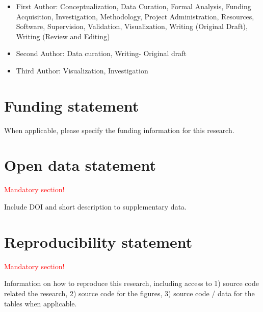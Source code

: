 \documentclass[
  manuscript=article,  %
  layout=preprint,  %
  year=20xx,
  volume=x,
]{extra/joas}
\begin{document}
\begin{itemize}
  \item First Author: Conceptualization, Data Curation, Formal Analysis, Funding Acquisition, Investigation, Methodology, Project Administration, Resources, Software, Supervision, Validation, Visualization, Writing (Original Draft), Writing (Review and Editing)
  \item Second Author: Data curation, Writing- Original draft
  \item Third Author: Visualization, Investigation
\end{itemize}


\section*{Funding statement}
When applicable, please specify the funding information for this research.


\section*{Open data statement}
\textcolor{red}{Mandatory section!}

Include DOI and short description to supplementary data.

\section*{Reproducibility statement}
\textcolor{red}{Mandatory section!}

Information on how to reproduce this research, including access to 1) source code related the research, 2) source code for the figures, 3) source code / data for the tables when applicable.



\printbibliography
\end{document}
